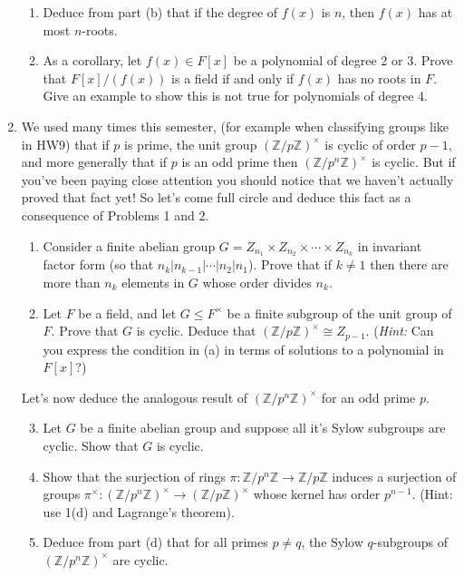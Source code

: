 \documentclass[11pt]{article}
\newcommand{\bZ}{\mathbb{Z}}
\begin{document}
\begin{enumerate}
{\begin{enumerate}
{    }
    \item{
    Deduce from part (b) that if the degree of $f(x)$ is $n$, then $f(x)$ has at most $n$-roots.
    }
    \item{
    As a corollary, let $f(x)\in F[x]$ be a polynomial of degree 2 or 3.  Prove that $F[x]/(f(x))$ is a field if and only if $f(x)$ has no roots in $F$.  Give an example to show this is not true for polynomials of degree 4.
    }
  \end{enumerate}
  }
  \item{
  We used many times this semester, (for example when classifying groups like in HW9) that if $p$ is prime, the unit group $(\bZ/p\bZ)^\times$ is cyclic of order $p-1$, and more generally that if $p$ is an odd prime then $(\bZ/p^n\bZ)^\times$ is cyclic.  But if you've been paying close attention you should notice that we haven't actually proved that fact yet!  So let's come full circle and deduce this fact as a consequence of Problems 1 and 2.
  \begin{enumerate}
    \item{
    Consider a finite abelian group $G = Z_{n_1}\times Z_{n_2}\times\cdots\times Z_{n_k}$ in invariant factor form (so that $n_k|n_{k-1}|\cdots|n_2|n_1$).  Prove that if $k\not=1$ then there are more than $n_k$ elements in $G$ whose order divides $n_k$.
    }
    \item{
    Let $F$ be a field, and let $G\le F^\times$ be a finite subgroup of the unit group of $F$.  Prove that $G$ is cyclic.  Deduce that $(\bZ/p\bZ)^\times\cong Z_{p-1}$.  (\textit{Hint:} Can you express the condition in (a) in terms of solutions to a polynomial in $F[x]$?)
    }
  \end{enumerate}
  Let's now deduce the analogous result of $(\bZ/p^n\bZ)^\times$ for an odd prime $p$.
  \begin{enumerate}
    \setcounter{enumii}{2}
    \item{
    Let $G$ be a finite abelian group and suppose all it's Sylow subgroups are cyclic.  Show that $G$ is cyclic.
    }
    \item{
    Show that the surjection of rings $\pi:\bZ/p^n\bZ\to\bZ/p\bZ$ induces a surjection of groups $\pi^\times:(\bZ/p^n\bZ)^\times\to(\bZ/p\bZ)^\times$ whose kernel has order $p^{n-1}$.  (Hint: use 1(d) and Lagrange's theorem).
    }
    \item{
    Deduce from part (d) that for all primes $p\not=q$, the Sylow $q$-subgroups of $(\bZ/p^n\bZ)^\times$ are cyclic.
    }
  \end{enumerate}
}
\end{enumerate}
\end{document}
